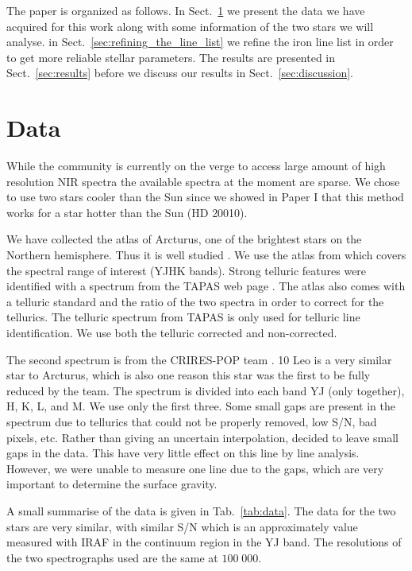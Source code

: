 \documentclass{aa}
\begin{document}
The paper is organized as follows. In Sect.~\ref{sec:data} we present the data
we have acquired for this work along with some information of the two stars we
will analyse. in Sect.~\ref{sec:refining_the_line_list} we refine the iron line
list in order to get more reliable stellar parameters. The results are presented
in Sect.~\ref{sec:results} before we discuss our results in
Sect.~\ref{sec:discussion}.




\section{Data}
\label{sec:data}

While the community is currently on the verge to access large amount of high
resolution NIR spectra the available spectra at the moment are sparse. We chose
to use two stars cooler than the Sun since we showed in Paper I that this method
works for a star hotter than the Sun (HD 20010).

We have collected the atlas of Arcturus, one of the brightest stars on the
Northern hemisphere. Thus it is well studied \citep[see e.g.][to mention just a
few]{Griffin1967,McWilliam1990,Ramirez2013}. We use the atlas from
\cite{Hinkle2003} which covers the spectral range of interest (YJHK bands).
Strong telluric features were identified with a spectrum from the TAPAS web page
\citep{Bertaux2014}. The atlas also comes with a telluric standard and the ratio
of the two spectra in order to correct for the tellurics. The telluric spectrum
from TAPAS is only used for telluric line identification. We use both the
telluric corrected and non-corrected.

The second spectrum is from the CRIRES-POP team \citep{Nicholls2016}. 10 Leo is
a very similar star to Arcturus, which is also one reason this star was the
first to be fully reduced by the team. The spectrum is divided into each band YJ
(only together), H, K, L, and M. We use only the first three. Some small gaps
are present in the spectrum due to tellurics that could not be properly removed,
low S/N, bad pixels, etc. Rather than giving an uncertain interpolation,
\citet{Nicholls2016} decided to leave small gaps in the data. This have very
little effect on this line by line analysis. However, we were unable to measure
one  line due to the gaps, which are very important to determine the
surface gravity.

A small summarise of the data is given in Tab.~\ref{tab:data}. The data for the
two stars are very similar, with similar S/N which is an approximately value
measured with IRAF in the continuum region in the YJ band. The resolutions of
the two spectrographs used are the same at $100\;000$.
\end{document}
